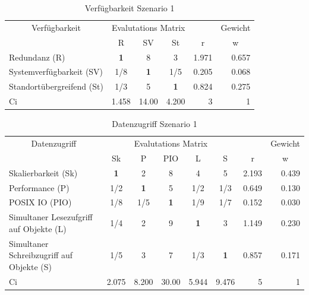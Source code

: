 \begin{table}[htbp]
\caption{Verfügbarkeit Szenario 1}
\begin{tabular}{|p{7.1cm}|c|c|c|r|r|}
\hline
\multicolumn{ 1}{|c|}{Verfügbarkeit} & \multicolumn{ 3}{c|}{Evalutations Matrix} & \multicolumn{1}{l|}{} & \multicolumn{1}{l|}{Gewicht} \\ \cline{ 2- 6}
\multicolumn{ 1}{|c|}{} & R & SV & St & \multicolumn{1}{c|}{r} & \multicolumn{1}{c|}{w} \\ \hline
Redundanz (R) & \textbf{1    } & 8     & 3     & 1.971 & 0.657 \\ \hline
Systemverfügbarkeit (SV) &  1/8 & \textbf{1} &  1/5 & 0.205 & 0.068 \\ \hline
Standortübergreifend (St) &  1/3 & 5     & \textbf{1} & 0.824 & 0.275 \\ \hline \hline
Ci & \multicolumn{1}{r|}{1.458} & \multicolumn{1}{r|}{14.00} & \multicolumn{1}{r|}{4.200} & 3 & 1 \\ \hline
\end{tabular}
\label{AHPVerfügbarkeitS1}
\end{table}


\begin{table}[htbp]
\caption{Datenzugriff Szenario 1}
\begin{tabular}{|p{4.5cm}|c|c|c|c|c|r|r|}
\hline
\multicolumn{ 1}{|c|}{Datenzugriff} & \multicolumn{ 5}{c|}{Evalutations Matrix} & \multicolumn{1}{l|}{} & \multicolumn{1}{l|}{Gewicht} \\ \cline{ 2- 8}
\multicolumn{ 1}{|c|}{} & Sk & P & PIO  & L & S & \multicolumn{1}{c|}{r} & \multicolumn{1}{c|}{w} \\ \hline
Skalierbarkeit (Sk) & \textbf{1} & 2 & 8 & 4 & 5 & 2.193 & 0.439 \\ \hline
Performance (P) &  1/2 & \textbf{1} & 5 &  1/2 &  1/3 & 0.649 & 0.130 \\ \hline
POSIX IO (PIO) &  1/8 &  1/5 & \textbf{1} &  1/9 &  1/7 & 0.152 & 0.030 \\ \hline
Simultaner Lesezufgriff 
auf Objekte (L) &  1/4 & 2 & 9 & \textbf{1} & 3 & 1.149 & 0.230 \\ \hline
Simultaner Schreibzugriff
 auf Objekte (S) &  1/5 & 3 & 7 &  1/3 & \textbf{1} & 0.857 & 0.171 \\ \hline \hline
Ci & \multicolumn{1}{r|}{2.075} & \multicolumn{1}{r|}{8.200} & \multicolumn{1}{r|}{30.00} & \multicolumn{1}{r|}{5.944} & \multicolumn{1}{r|}{9.476} & 5 & 1 \\ \hline
\end{tabular}
\label{AHPDatenzugriffS1}
\end{table}

